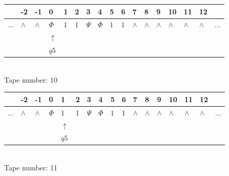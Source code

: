 \documentclass[11pt]{article}
\begin{document}
\begin{table}[H]
\centering
\begin{tabular}{lllllllllllllllll}
 & -2 & -1 & 0 & 1 & 2 & 3 & 4 & 5 & 6 & 7 & 8 & 9 & 10 & 11 & 12 & \\
\hline
$...$ & \multicolumn{1}{|l|}{$\wedge$} & \multicolumn{1}{|l|}{$\wedge$} & \multicolumn{1}{|l|}{$\Phi$} & \multicolumn{1}{|l|}{$1$} & \multicolumn{1}{|l|}{$1$} & \multicolumn{1}{|l|}{$\Psi$} & \multicolumn{1}{|l|}{$\Phi$} & \multicolumn{1}{|l|}{$1$} & \multicolumn{1}{|l|}{$1$} & \multicolumn{1}{|l|}{$\wedge$} & \multicolumn{1}{|l|}{$\wedge$} & \multicolumn{1}{|l|}{$\wedge$} & \multicolumn{1}{|l|}{$\wedge$} & \multicolumn{1}{|l|}{$\wedge$} & \multicolumn{1}{|l|}{$\wedge$} & $...$\\
\hline
&  &  & $\uparrow$ &  &  &  &  &  &  &  &  &  &  &  &  &  \\
&  &  & $ q5 $ &  &  &  &  &  &  &  &  &  &  &  &  &  \\
\end{tabular}
\\
Tape number: 10
\noindent\makebox[\linewidth]{\hdashrule{\textwidth}{1pt}{1pt}}\end{table}

\begin{table}[H]
\centering
\begin{tabular}{lllllllllllllllll}
 & -2 & -1 & 0 & 1 & 2 & 3 & 4 & 5 & 6 & 7 & 8 & 9 & 10 & 11 & 12 & \\
\hline
$...$ & \multicolumn{1}{|l|}{$\wedge$} & \multicolumn{1}{|l|}{$\wedge$} & \multicolumn{1}{|l|}{$\Phi$} & \multicolumn{1}{|l|}{$1$} & \multicolumn{1}{|l|}{$1$} & \multicolumn{1}{|l|}{$\Psi$} & \multicolumn{1}{|l|}{$\Phi$} & \multicolumn{1}{|l|}{$1$} & \multicolumn{1}{|l|}{$1$} & \multicolumn{1}{|l|}{$\wedge$} & \multicolumn{1}{|l|}{$\wedge$} & \multicolumn{1}{|l|}{$\wedge$} & \multicolumn{1}{|l|}{$\wedge$} & \multicolumn{1}{|l|}{$\wedge$} & \multicolumn{1}{|l|}{$\wedge$} & $...$\\
\hline
&  &  &  & $\uparrow$ &  &  &  &  &  &  &  &  &  &  &  &  \\
&  &  &  & $ q5 $ &  &  &  &  &  &  &  &  &  &  &  &  \\
\end{tabular}
\\
Tape number: 11
\noindent\makebox[\linewidth]{\hdashrule{\textwidth}{1pt}{1pt}}\end{table}
\clearpage
\end{document}
